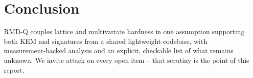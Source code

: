 \section{Conclusion}

RMD-Q couples lattice and multivariate hardness in one assumption supporting
both KEM and signatures from a shared lightweight codebase, with
measurement-backed analysis and an explicit, checkable list of what remains
unknown. We invite attack on every open item -- that scrutiny is the point
of this report.
